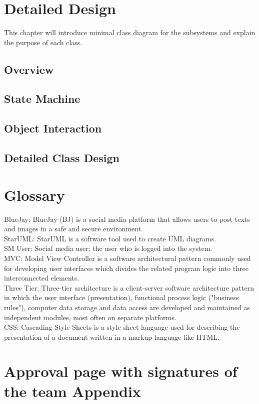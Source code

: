 \documentclass{report}
\begin{document}
\chapter{Detailed Design}
	This chapter will introduce minimal class diagram for the subsystems and explain the purpose of each class.
\section{Overview}
\section{State Machine}
\section{Object Interaction}
\section{Detailed Class Design}
\chapter{Glossary}
BlueJay: BlueJay (BJ) is a social media platform that allows users to post texts and images in a safe and secure environment.\\
StarUML: StarUML is a software tool used to create UML diagrams.\\
SM User: Social media user; the user who is logged into the system.\\
MVC: Model View Controller is a software architectural pattern commonly used for developing user interfaces which divides the related program logic into three interconnected elements.\\
Three Tier: Three-tier architecture is a client-server software architecture pattern in which the user interface (presentation), functional process logic ("business rules"), computer data storage and data access are developed and maintained as independent modules, most often on separate platforms.\\
CSS: Cascading Style Sheets is a style sheet language used for describing the presentation of a document written in a markup language like HTML.\\
\chapter{Approval page with signatures of the team Appendix} 
\end{document}
